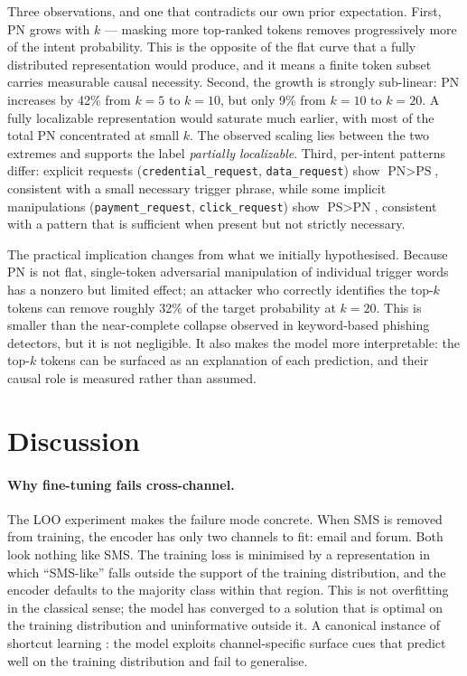 \documentclass[preprint,12pt,authoryear]{elsarticle}
\begin{document}
Three observations, and one that contradicts our own prior
expectation. First, PN grows with $k$ --- masking more top-ranked
tokens removes progressively more of the intent probability. This is
the opposite of the flat curve that a fully distributed
representation would produce, and it means a finite token subset
carries measurable causal necessity. Second, the growth is strongly
sub-linear: PN increases by 42\% from $k=5$ to $k=10$, but only
9\% from $k=10$ to $k=20$. A fully localizable representation
would saturate much earlier, with most of the total PN concentrated
at small $k$. The observed scaling lies between the two extremes
and supports the label \emph{partially localizable}. Third,
per-intent patterns differ: explicit requests
(\texttt{credential\_request}, \texttt{data\_request}) show
$\text{PN} > \text{PS}$, consistent with a small necessary trigger
phrase, while some implicit manipulations (\texttt{payment\_request},
\texttt{click\_request}) show $\text{PS} > \text{PN}$, consistent
with a pattern that is sufficient when present but not strictly
necessary.

The practical implication changes from what we initially
hypothesised. Because PN is not flat, single-token adversarial
manipulation of individual trigger words has a nonzero but limited
effect; an attacker who correctly identifies the top-$k$ tokens can
remove roughly 32\% of the target probability at $k=20$. This is
smaller than the near-complete collapse observed in keyword-based
phishing detectors, but it is not negligible. It also makes the
model more interpretable: the top-$k$ tokens can be surfaced as an
explanation of each prediction, and their causal role is measured
rather than assumed.

\section{Discussion}
\label{sec:disc}

\paragraph*{Why fine-tuning fails cross-channel.} The LOO experiment
makes the failure mode concrete. When SMS is removed from training,
the encoder has only two channels to fit: email and forum. Both look
nothing like SMS. The training loss is minimised by a representation
in which ``SMS-like'' falls outside the support of the training
distribution, and the encoder defaults to the majority class within
that region. This is not overfitting in the classical sense; the
model has converged to a solution that is optimal on the training
distribution and uninformative outside it. A canonical instance of
shortcut learning \citep{geirhos2020shortcut}: the model exploits
channel-specific surface cues that predict well on the training
distribution and fail to generalise.
\end{document}
